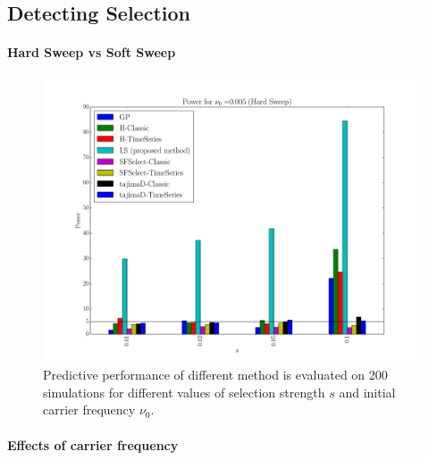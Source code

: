 \documentclass[11pt]{article}
\begin{document}
\subsection{Detecting Selection}
\paragraph{Hard Sweep vs Soft Sweep}
\begin{figure}
	\centering
	\includegraphics[trim=2.2in 0 2.2in 0 , clip,width=\textwidth]{power}
		\caption{Predictive performance of different method is evaluated on 200 
		simulations for different values of selection strength $s$ and initial 
		carrier frequency $\nu_0$.} \label{fig:power}
\end{figure}



\paragraph{Effects of carrier frequency}
\end{document}
